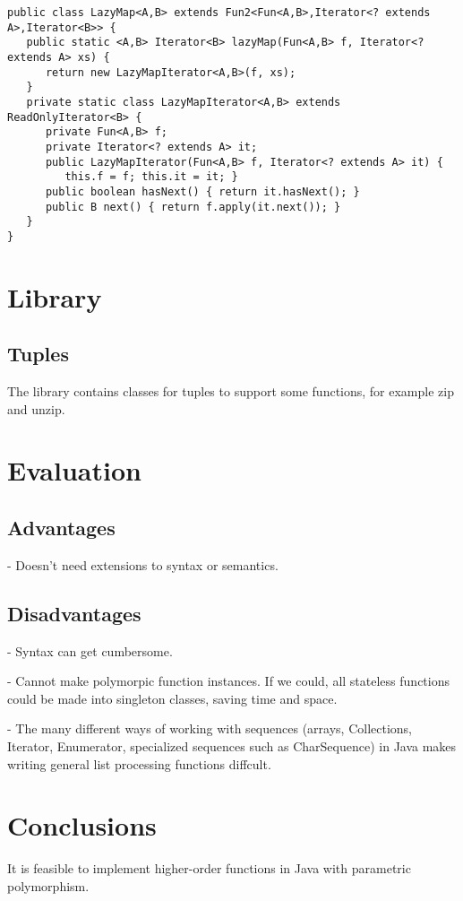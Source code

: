 \documentclass{article}
\begin{document}
\begin{Verbatim}
public class LazyMap<A,B> extends Fun2<Fun<A,B>,Iterator<? extends A>,Iterator<B>> {
   public static <A,B> Iterator<B> lazyMap(Fun<A,B> f, Iterator<? extends A> xs) {
      return new LazyMapIterator<A,B>(f, xs);
   }
   private static class LazyMapIterator<A,B> extends ReadOnlyIterator<B> {
      private Fun<A,B> f;
      private Iterator<? extends A> it;
      public LazyMapIterator(Fun<A,B> f, Iterator<? extends A> it) {
         this.f = f; this.it = it; }
      public boolean hasNext() { return it.hasNext(); }
      public B next() { return f.apply(it.next()); }
   }
}
\end{Verbatim}

\section{Library}

\subsection{Tuples}

The library contains classes for tuples to support some 
functions, for example zip and unzip.


\section{Evaluation}

\subsection{Advantages}

- Doesn't need extensions to syntax or semantics.

\subsection{Disadvantages}

- Syntax can get cumbersome.

- Cannot make polymorpic function instances. If we could, all stateless
  functions could be made into singleton classes, saving time and space.

- The many different ways of working with sequences (arrays, Collections,
  Iterator, Enumerator, specialized sequences such as CharSequence) in 
  Java makes writing general list processing functions diffcult.


\section{Conclusions}

It is feasible to implement higher-order functions in Java with 
parametric polymorphism. 



\end{document}
